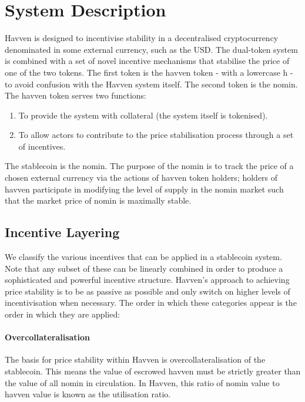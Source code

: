 \section{System Description} Havven is designed to incentivise stability in a decentralised cryptocurrency denominated in some external currency, such as the USD. The dual-token system is combined with a set of novel incentive mechanisms that stabilise the price of one of the two tokens. The first token is the havven token - with a lowercase h - to avoid confusion with the Havven system itself. The second token is the nomin. \\

\noindent The havven token serves two functions:

\begin{enumerate}
\item{To provide the system with collateral (the system itself is tokenised).}
\item{To allow actors to contribute to the price stabilisation process through a set of incentives.}
\end{enumerate}

\noindent The stablecoin is the nomin. The purpose of the nomin is to track the price of a chosen external currency via the actions of havven token holders; holders of havven participate in modifying the level of supply in the nomin market such that the market price of nomin is maximally stable.

\subsection{Incentive Layering}

We classify the various incentives that can be applied in a stablecoin system. Note that any subset of these can be linearly combined in order to produce a sophisticated and powerful incentive structure. Havven's approach to achieving price stability is to be as passive as possible and only switch on higher levels of incentivisation when necessary. The order in which these categories appear is the order in which they are applied:

\paragraph{Overcollateralisation}

The basis for price stability within Havven is overcollateralisation of the stablecoin. This means the value of escrowed havven must be strictly greater than the value of all nomin in circulation. In Havven, this ratio of nomin value to havven value is known as the utilisation ratio.


